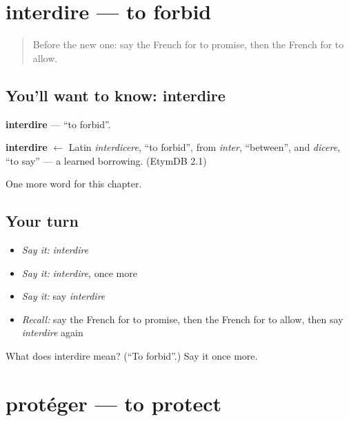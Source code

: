 \section[interdire]{interdire — to forbid}

\label{lesson:FR-C177-interdire}



\begin{quote}
Before the new one: say the French for to promise, then the French for to allow.
\end{quote}

\subsection*{You'll want to know: interdire}
\textbf{interdire} — \textquotedblleft{}to forbid\textquotedblright{}.

\begin{cousinweb}
\textbf{interdire} $\leftarrow$ Latin \emph{interdicere}, \textquotedblleft{}to forbid\textquotedblright{}, from \emph{inter}, \textquotedblleft{}between\textquotedblright{}, and \emph{dicere}, \textquotedblleft{}to say\textquotedblright{} — a learned borrowing. (EtymDB 2.1)
\end{cousinweb}

\begin{grammarlens}[title={What you've built}]
One more word for this chapter.
\end{grammarlens}

\subsection*{Your turn}
\begin{itemize}
\raggedright
  \item \emph{Say it:} \emph{interdire}
  \item \emph{Say it:} \emph{interdire}, once more
  \item \emph{Say it:} say \emph{interdire}
  \item \emph{Recall:} say the French for to promise, then the French for to allow, then say \emph{interdire} again
\end{itemize}

\begin{tcolorbox}[breakable,colback=teal!4,colframe=teal!35!black,title={Before you move on}]
What does interdire mean? (\textquotedblleft{}To forbid\textquotedblright{}.) Say it once more.
\end{tcolorbox}
\section[protéger]{protéger — to protect}

